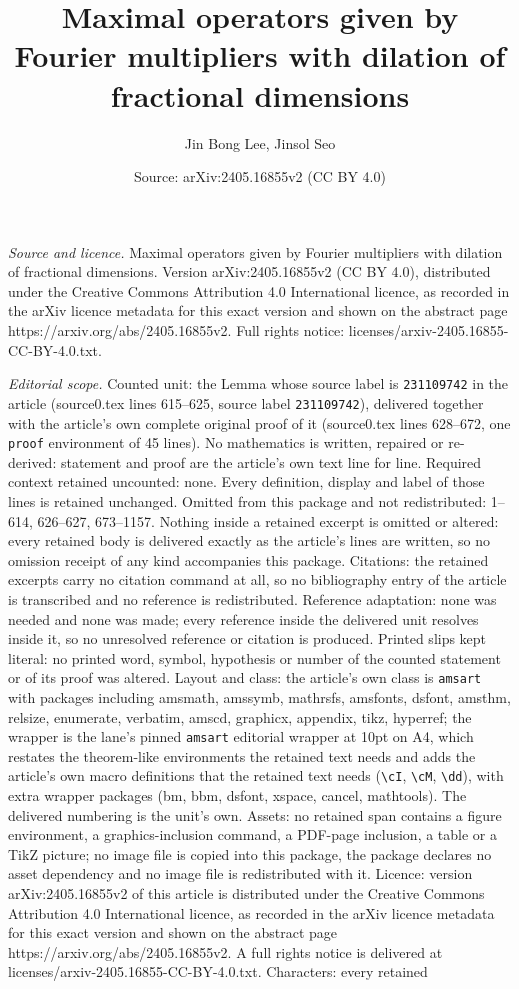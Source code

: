 \documentclass[10pt,a4paper]{amsart}
\title[Maximal operators given by Fourier multipliers with dilation]{Maximal operators given by Fourier multipliers with dilation of fractional dimensions}
\author{Jin Bong Lee, Jinsol Seo}
\date{Source: arXiv:2405.16855v2 (CC BY 4.0)}
\begin{document}
\maketitle

\noindent\emph{Source and licence.} Maximal operators given by Fourier multipliers with dilation of fractional dimensions. Version arXiv:2405.16855v2 (CC BY 4.0), distributed under the Creative Commons Attribution 4.0 International licence, as recorded in the arXiv licence metadata for this exact version and shown on the abstract page https://arxiv.org/abs/2405.16855v2. Full rights notice: licenses/arxiv-2405.16855-CC-BY-4.0.txt.\par\smallskip

\noindent\textit{Editorial scope.} Counted unit: the Lemma whose source label is \texttt{231109742} in the article (source0.tex lines 615--625, source label \texttt{231109742}), delivered together with the article's own complete original proof of it (source0.tex lines 628--672, one \texttt{proof} environment of 45 lines). No mathematics is written, repaired or re-derived: statement and proof are the article's own text line for line. Required context retained uncounted: none. Every definition, display and label of those lines is retained unchanged. Omitted from this package and not redistributed: 1--614, 626--627, 673--1157. Nothing inside a retained excerpt is omitted or altered: every retained body is delivered exactly as the article's lines are written, so no omission receipt of any kind accompanies this package. Citations: the retained excerpts carry no citation command at all, so no bibliography entry of the article is transcribed and no reference is redistributed. Reference adaptation: none was needed and none was made; every reference inside the delivered unit resolves inside it, so no unresolved reference or citation is produced. Printed slips kept literal: no printed word, symbol, hypothesis or number of the counted statement or of its proof was altered. Layout and class: the article's own class is \texttt{amsart} with packages including amsmath, amssymb, mathrsfs, amsfonts, dsfont, amsthm, relsize, enumerate, verbatim, amscd, graphicx, appendix, tikz, hyperref; the wrapper is the lane's pinned \texttt{amsart} editorial wrapper at 10pt on A4, which restates the theorem-like environments the retained text needs and adds the article's own macro definitions that the retained text needs (\texttt{\textbackslash cI}, \texttt{\textbackslash cM}, \texttt{\textbackslash dd}), with extra wrapper packages (bm, bbm, dsfont, xspace, cancel, mathtools). The delivered numbering is the unit's own. Assets: no retained span contains a figure environment, a graphics-inclusion command, a PDF-page inclusion, a table or a TikZ picture; no image file is copied into this package, the package declares no asset dependency and no image file is redistributed with it. Licence: version arXiv:2405.16855v2 of this article is distributed under the Creative Commons Attribution 4.0 International licence, as recorded in the arXiv licence metadata for this exact version and shown on the abstract page https://arxiv.org/abs/2405.16855v2. A full rights notice is delivered at licenses/arxiv-2405.16855-CC-BY-4.0.txt. Characters: every retained 
\end{document}

